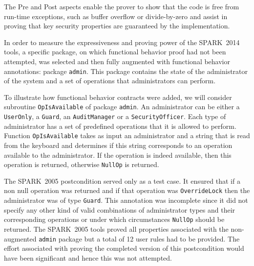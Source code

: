 \documentclass[10pt,a4paper,twocolumn]{article}
\newcommand{\oldspark}{SPARK~2005\xspace}
\newcommand{\newspark}{SPARK~2014\xspace}
\newcommand{\eg}{\textit{e.g.}\xspace}
\begin{document}
The Pre and Post aspects enable the prover to show that the code is
free from run-time exceptions, such as buffer overflow or
divide-by-zero and assist in proving that key security properties are
guaranteed by the implementation.

In order to measure the expressiveness and proving power of the
\newspark tools, a specific package, on which functional behavior
proof had not been attempted, was selected and then fully augmented
with functional behavior annotations: package \verb|admin|.
This package contains the state of the
administrator of the system and a set of operations that
administrators can perform.

To illustrate how functional behavior contracts were added, we will
consider subroutine \verb|OpIsAvailable| of package \verb|admin|. An
administrator can be either a \verb|UserOnly|, a \verb|Guard|, an
\verb|AuditManager| or a \verb|SecurityOfficer|. Each type of
administrator has a set of predefined operations that it is allowed to
perform. Function \verb|OpIsAvailable| takes as input an administrator
and a string that is read from the keyboard and determines if this
string corresponds to an operation available to the administrator. If
the operation is indeed available, then this operation is returned,
otherwise \verb|NullOp| is returned.

The \oldspark postcondition served only as a test case. It ensured
that if a non null operation was returned and if that operation was
\verb|OverrideLock| then the administrator was of type
\verb|Guard|. This annotation was incomplete since it did not specify
any other kind of valid combinations of administrator types and their
corresponding operations
or under which circumstances \verb|NullOp| should be returned.  The
\oldspark tools proved all properties associated with the
non-augmented \verb|admin| package but a total of 12 user rules had to
be provided. The effort associated with proving the completed version
of this postcondition would have been significant and hence this was
not attempted.
\end{document}
